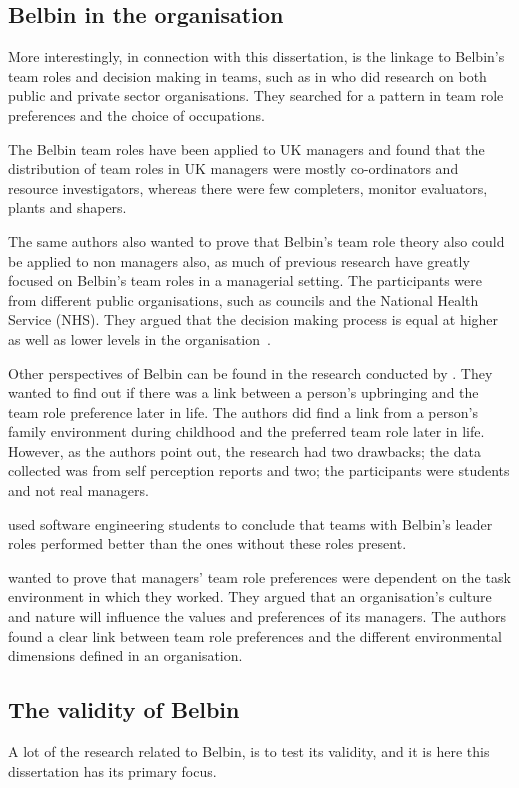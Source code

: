 \documentclass[a4paper,12pt,titlepage]{report}
\begin{document}
  \subsection{Belbin in the organisation}
  More interestingly, in connection with this dissertation,
  is the linkage to Belbin's team roles and decision making in teams,
  such as in \citet{sbab} who did research on both public and private sector
  organisations. They searched for a pattern in team role preferences and the choice
  of occupations. 

  The Belbin team roles have been applied to UK managers and \citet{sfthwm2}
  found that the distribution of team roles in UK managers were mostly
  co-ordinators and resource investigators, whereas there were few
  completers, monitor evaluators, plants and shapers.
  
  The same authors also wanted to prove that Belbin's team role theory also
  could be applied to non managers also, as much of previous research have
  greatly focused on Belbin's team roles in a managerial setting. The participants
  were from different public organisations, such as councils and the
  National Health Service (NHS). They argued
  that the decision making process is equal at higher as well as lower levels
  in the organisation~\cite[20]{sfthwm3}.

  Other perspectives of Belbin can be found in the research
  conducted by \citet{sfwm}. They wanted to find out if there
  was a link between a person's upbringing and the team role preference later
  in life. The authors did find a link from a person's family
  environment during childhood and the preferred team role later in life.
  However, as the authors point out, the research had two drawbacks;
  the data collected was from self perception reports
  and two; the participants were students and not real managers.

  \citet{shts} used software engineering students to conclude that teams with
  Belbin's leader roles performed better than the ones without these roles present.

  \citet{ysht} wanted to prove that managers' team role preferences 
  were dependent on the task environment in which they worked. They argued that
  an organisation's culture and nature will influence the values and preferences
  of its managers. The authors found a clear link between team role preferences and
  the different environmental dimensions defined in an organisation.

  \subsection{The validity of Belbin}
  A lot of the research related to Belbin, is to test its validity, and it
  is here this dissertation has its primary focus.
\end{document}
